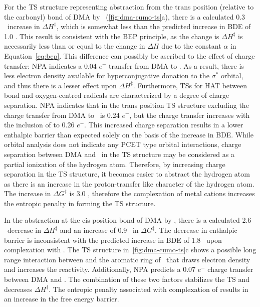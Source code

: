 \begin{doublespace}
For the TS structure representing abstraction from the trans position (relative
to the carbonyl)  bond of DMA by \cumo\ (\ref{fig:dma-cumo-ts}a), there
is a calculated 0.3 \kcalmol\ increase in $\Delta H^\ddagger$, which is somewhat
less than the predicted increase in BDE of 1.0 \kcalmol. This result is
consistent with the BEP principle, as the change is $\Delta H^\ddagger$ is
necessarily less than or equal to the change in $\Delta H$ due to the constant
$\alpha$ in Equation~\ref{eq:bep}. This difference can possibly be ascribed to
the effect of charge transfer: NPA indicates a 0.04 $e^-$ transfer from DMA to
. As a result, there is less electron density available for
hyperconjugative donation to the  $\sigma^*$ orbital, and thus there is
a lesser effect upon $\Delta H^\ddagger$.  Furthermore, TSs for HAT between
 bond and oxygen-centred radicals are characterized by a degree of
charge separation.\cite{Roberts1999} NPA indicates that in the trans position TS
structure excluding  the charge transfer from DMA to \cumo\ is 0.24
$e^-$, but the charge transfer increases with the inclusion of  to 0.26
$e^-$. This increased charge separation results in a lower enthalpic barrier
than expected solely on the basis of the increase in  BDE. While orbital
analysis does not indicate any PCET type orbital interactions, charge separation
between DMA and \cumo\ in the TS structure may be considered as a partial
ionization of the hydrogen atom. Therefore, by increasing charge separation in
the TS structure, it becomes easier to abstract the hydrogen atom as there is an
increase in the proton-transfer like character of the hydrogen atom. The
increase in $\Delta G^\ddagger$ is 3.0 \kcalmol, therefore the complexation of
metal cations increases the entropic penalty in forming the TS structure.

In the abstraction at the cis position  bond of DMA by \cumo, there is a
calculated 2.6 \kcalmol\ decrease in $\Delta H^\ddagger$ and an increase of 0.9
\kcalmol\ in $\Delta G^\ddagger$. The decrease in enthalpic barrier is
inconsistent with the predicted increase in BDE of 1.8 \kcalmol\ upon
complexation with . The TS structure in~\ref{fig:dma-cumo-ts}c shows a
possible long range interaction between  and the aromatic ring of \cumo\
that draws electron density and increases the reactivity. Additionally, NPA
predicts a 0.07 $e^-$ charge transfer between DMA and \ch{Na}. The combination
of these two factors stabilizes the TS and decreases $\Delta H^\ddagger$. The
entropic penalty associated with complexation of \ch{NaCl} results in an
increase in the free energy barrier.


\end{doublespace}

